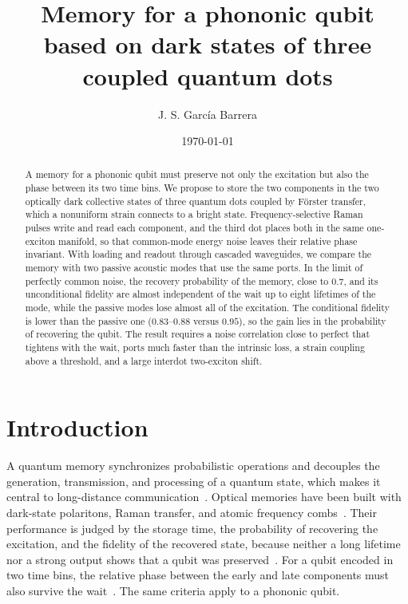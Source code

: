 \documentclass[aps,pra,preprint,groupedaddress,amsmath,amssymb,floatfix]{revtex4-2}
\begin{document}
\title{Memory for a phononic qubit based on dark states of three coupled quantum dots}

\author{J. S. Garc\'ia Barrera}

\date{\today}

\begin{abstract}
A memory for a phononic qubit must preserve not only the excitation but also the phase between its two time bins. We propose to store the two components in the two optically dark collective states of three quantum dots coupled by F\"orster transfer, which a nonuniform strain connects to a bright state. Frequency-selective Raman pulses write and read each component, and the third dot places both in the same one-exciton manifold, so that common-mode energy noise leaves their relative phase invariant. With loading and readout through cascaded waveguides, we compare the memory with two passive acoustic modes that use the same ports. In the limit of perfectly common noise, the recovery probability of the memory, close to $0.7$, and its unconditional fidelity are almost independent of the wait up to eight lifetimes of the mode, while the passive modes lose almost all of the excitation. The conditional fidelity is lower than the passive one ($0.83$--$0.88$ versus $0.95$), so the gain lies in the probability of recovering the qubit. The result requires a noise correlation close to perfect that tightens with the wait, ports much faster than the intrinsic loss, a strain coupling above a threshold, and a large interdot two-exciton shift.
\end{abstract}

\maketitle

\section{Introduction}
\label{sec:intro}

A quantum memory synchronizes probabilistic operations and decouples the generation, transmission, and processing of a quantum state, which makes it central to long-distance communication~\cite{duan2001}. Optical memories have been built with dark-state polaritons, Raman transfer, and atomic frequency combs~\cite{fleischhauer2002,gorshkov2007,afzelius2009}. Their performance is judged by the storage time, the probability of recovering the excitation, and the fidelity of the recovered state, because neither a long lifetime nor a strong output shows that a qubit was preserved~\cite{hedges2010,ortu2022,wang2019}. For a qubit encoded in two time bins, the relative phase between the early and late components must also survive the wait~\cite{ortu2022}. The same criteria apply to a phononic qubit.
\end{document}
